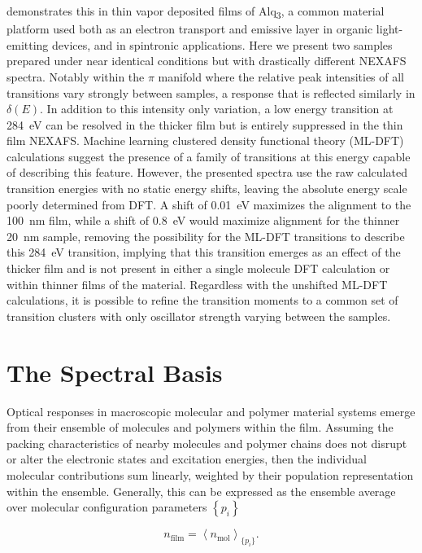  demonstrates this in thin vapor deposited films of Alq\textsubscript{3}, a common material platform used both as an electron transport and emissive layer in organic light-emitting devices, and in spintronic applications. Here we present two samples prepared under near identical conditions but with drastically different NEXAFS spectra. Notably within the \(\pi\) manifold where the relative peak intensities of all transitions vary strongly between samples, a response that is reflected similarly in \(\delta(E)\). In addition to this intensity only variation, a low energy transition at \qty{284}{eV} can be resolved in the thicker film but is entirely suppressed in the thin film NEXAFS. Machine learning clustered density functional theory (ML-DFT) calculations suggest the presence of a family of transitions at this energy capable of describing this feature. However, the presented spectra use the raw calculated transition energies with no static energy shifts, leaving the absolute energy scale poorly determined from DFT. A shift of \qty{+0.01}{eV} maximizes the alignment to the \qty{100}{nm} film, while a shift of \qty{0.8}{eV} would maximize alignment for the thinner \qty{20}{nm} sample, removing the possibility for the ML-DFT transitions to describe this \qty{284}{eV} transition, implying that this transition emerges as an effect of the thicker film and is not present in either a single molecule DFT calculation or within thinner films of the material. Regardless with the unshifted ML-DFT calculations, it is possible to refine the transition moments to a common set of transition clusters with only oscillator strength varying between the samples.

\section{The Spectral Basis}\label{sec:the-spectral-basis}

Optical responses in macroscopic molecular and polymer material systems emerge from their ensemble of molecules and polymers within the film. Assuming the packing characteristics of nearby molecules and polymer chains does not disrupt or alter the electronic states and excitation energies, then the individual molecular contributions sum linearly, weighted by their population representation within the ensemble. Generally, this can be expressed as the ensemble average over molecular configuration parameters \(\left\{ p_{i} \right\}\)

\begin{equation}
  n_{\mathrm{film}} = \left\langle n_{\mathrm{mol}} \right\rangle_{\{ p_{i} \}}.
  \label{eq:ensemble-average}
\end{equation}

